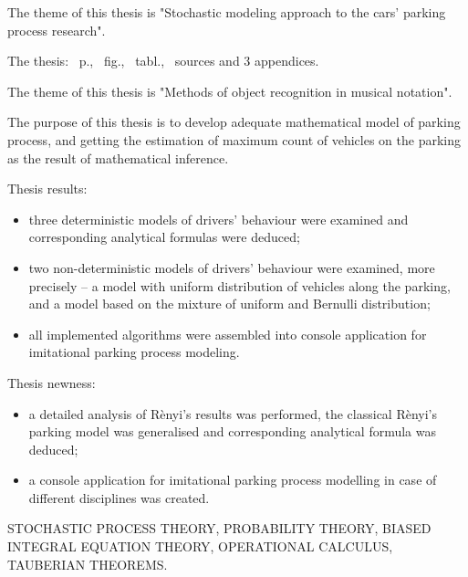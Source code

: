 The theme of this thesis is "Stochastic modeling approach to the cars' parking process research".

The thesis: \pageref*{MyLastPage}~p., \totfig~fig., \tottab~tabl., ~sources and 3 appendices.

The theme of this thesis is "Methods of object recognition in musical notation".

The purpose of this thesis is to develop adequate mathematical model of parking process, and getting the estimation of maximum count of vehicles on the parking as the result of mathematical inference.

Thesis results:
\begin{itemize}
	\item three deterministic models of drivers' behaviour were examined and corresponding analytical formulas were deduced;
	\item two non-deterministic models of drivers' behaviour were examined, more precisely – a model with uniform distribution of vehicles along the parking, and a model based on the mixture of uniform and Bernulli distribution;
	\item all implemented algorithms were assembled into console application for imitational parking process modeling.
\end{itemize}

Thesis newness:
\begin{itemize}
	\item a detailed analysis of Rènyi's results was performed, the classical Rènyi's parking model was generalised and corresponding analytical formula was deduced;
	\item a console application for imitational parking process modelling in case of different disciplines was created.  
\end{itemize}

\MakeUppercase{stochastic process theory, probability theory, biased integral equation theory, operational calculus, tauberian theorems.}